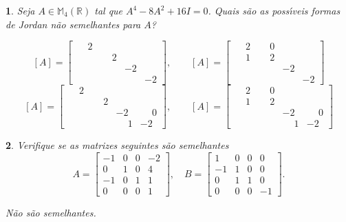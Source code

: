 \documentclass[12pt]{exam}
\newtheorem{exercicio}{}
\newcommand{\real}{\mathbb{R}}
\newcommand{\cp}[1]{\mathbb{#1}}
\begin{document}
\begin{exercicio}
  Seja $A \in \cp{M}_4(\real)$ tal que $A^4 - 8A^2 + 16I = 0$. Quais s\~ao as poss{\'\i}veis formas de Jordan n\~ao semelhantes para $A$?
  \begin{solucao}
    \[
      [A] = \begin{bmatrix}
        \phantom{-}2 \\
        & \phantom{-}2 \\
        & & -2\\
        & & & -2
      \end{bmatrix},\qquad [A] = \begin{bmatrix}
        \phantom{-}2 & \phantom{-}0\\
        \phantom{-}1& \phantom{-}2 \\
        & & -2\\
        & & & -2
      \end{bmatrix}\]
      \[
      [A] = \begin{bmatrix}
        \phantom{-}2\\
        & \phantom{-}2 \\
        & & -2 & \phantom{-}0\\
        & & \phantom{-}1& -2
      \end{bmatrix},\qquad
      [A] = \begin{bmatrix}
        \phantom{-}2 & \phantom{-}0\\
        \phantom{-}1& \phantom{-}2 \\
        & & -2 & \phantom{-}0\\
        & & \phantom{-}1& -2
      \end{bmatrix}
    \]
  \end{solucao}
\end{exercicio}

\begin{exercicio}
  Verifique se as matrizes seguintes s\~ao semelhantes
  \[
    A = \begin{bmatrix}
      -1 & 0 & 0 & -2\\
      0 & 1 & 0 & 4\\
      -1 & 0 & 1 & 1\\
      0 & 0 & 0 & 1
    \end{bmatrix}, \quad B = \begin{bmatrix}
      1 & 0 & 0 & 0\\
      -1 & 1 & 0 & 0\\
      0 & 1 & 1 & 0\\
      0 & 0 & 0 & -1
    \end{bmatrix}.
  \]
  \begin{solucao}
    N\~ao s\~ao semelhantes.
  \end{solucao}
\end{exercicio}
\end{document}
